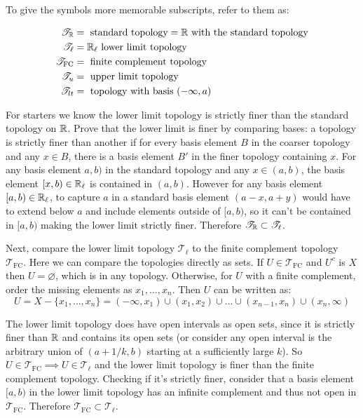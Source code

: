 \documentclass{article}
\begin{document}
  To give the symbols more memorable subscripts, refer to them as:

  \begin{align*}
    \mathscr{T}_{\mathbb{R}}        & = \text{ standard topology} = \mathbb{R} \text{ with the standard topology} \\
    \mathscr{T}_{\ell}      & = \mathbb{R}_\ell \text{ lower limit topology}                              \\
    \mathscr{T}_{\text{FC}} & = \text{ finite complement topology}                                \\
    \mathscr{T}_u           & = \text{ upper limit topology}                                      \\
    \mathscr{T}_{lt}        & = \text{ topology with basis } (-\infty, a)
  \end{align*}

  For starters we know the lower limit topology is strictly finer than the standard topology on $\mathbb{R}$. Prove that the lower limit is finer by comparing bases: a topology is strictly finer than another if for every basis element $B$ in the coarser topology and any $x \in B$, there is a basis element $B'$ in the finer topology containing $x$. For any basis element $a, b)$ in the standard topology and any $x \in (a, b)$, the basis element $[x, b) \in \mathbb{R}_\ell$ is contained in $(a, b)$. However for any basis element $[a, b) \in \mathbb{R}_\ell$, to capture $a$ in a standard basis element $(a-x, a+y)$ would have to extend below $a$ and include elements outside of $[a, b)$, so it can't be contained in $[a, b)$ making the lower limit strictly finer. Therefore $\mathscr{T}_{\mathbb{R}} \subset \mathscr{T}_{\ell}$.

  Next, compare the lower limit topology $\mathscr{T}_\ell$ to the finite complement topology $\mathscr{T}_{\text{FC}}$. Here we can compare the topologies directly as sets. If $U \in \mathscr{T}_{\text{FC}}$ and $U^c$ is $X$ then $U = \varnothing$, which is in any topology. Otherwise, for $U$ with a finite complement, order the missing elements as $x_1, \ldots, x_n$. Then $U$ can be written as:
$$U = X - \{x_1, \ldots, x_n\} = (-\infty, x_1) \cup (x_1, x_2) \cup \ldots \cup (x_{n-1}, x_n) \cup (x_n, \infty)$$

  The lower limit topology does have open intervals as open sets, since it is strictly finer than $\mathbb{R}$ and contains its open sets (or consider any open interval is the arbitrary union of $(a + 1/k, b)$ starting at a sufficiently large $k$). So $U \in \mathscr{T}_{\text{FC}} \implies U \in \mathscr{T}_\ell$ and the lower limit topology is finer than the finite complement topology. Checking if it's strictly finer, consider that a basis element $[a, b)$ in the lower limit topology has an infinite complement and thus not open in $\mathscr{T}_{\text{FC}}$. Therefore $\mathscr{T}_{\text{FC}} \subset \mathscr{T}_\ell$.
\end{document}

